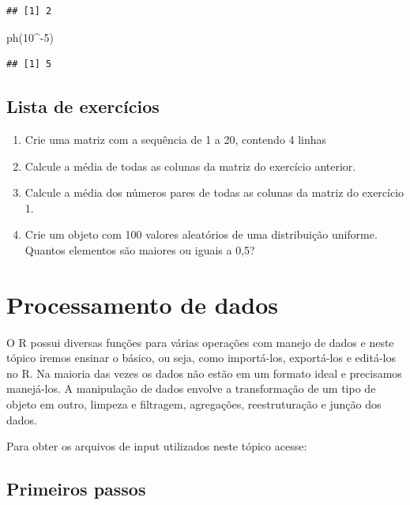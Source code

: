 \documentclass[
]{book}
\newenvironment{Shaded}{\begin{snugshade}}{\end{snugshade}}
\newcommand{\DecValTok}[1]{\textcolor[rgb]{0.00,0.00,0.81}{#1}}
\newcommand{\FunctionTok}[1]{\textcolor[rgb]{0.00,0.00,0.00}{#1}}
\newcommand{\NormalTok}[1]{#1}
\newcommand{\SpecialCharTok}[1]{\textcolor[rgb]{0.00,0.00,0.00}{#1}}
\providecommand{\tightlist}{%
  \setlength{\itemsep}{0pt}\setlength{\parskip}{0pt}}
\begin{document}
\begin{verbatim}
## [1] 2
\end{verbatim}

\begin{Shaded}
\begin{Highlighting}[]
\FunctionTok{ph}\NormalTok{(}\DecValTok{10}\SpecialCharTok{\^{}{-}}\DecValTok{5}\NormalTok{)}
\end{Highlighting}
\end{Shaded}

\begin{verbatim}
## [1] 5
\end{verbatim}

\hypertarget{lista-de-exercuxedcios-1}{%
\section{Lista de exercícios}\label{lista-de-exercuxedcios-1}}

\begin{enumerate}
\def\labelenumi{\arabic{enumi}.}
\tightlist
\item
  Crie uma matriz com a sequência de 1 a 20, contendo 4 linhas
\item
  Calcule a média de todas as colunas da matriz do exercício anterior.
\item
  Calcule a média dos números pares de todas as colunas da matriz do exercício 1.
\item
  Crie um objeto com 100 valores aleatórios de uma distribuição uniforme. Quantos elementos são maiores ou iguais a 0,5?
\end{enumerate}

\hypertarget{processamento-de-dados}{%
\chapter{Processamento de dados}\label{processamento-de-dados}}

O R possui diversas funções para várias operações com manejo de dados e neste tópico iremos ensinar o básico, ou seja, como importá-los, exportá-los e editá-los no R. Na maioria das vezes os dados não estão em um formato ideal e precisamos manejá-los. A manipulação de dados envolve a transformação de um tipo de objeto em outro, limpeza e filtragem, agregações, reestruturação e junção dos dados.

Para obter os arquivos de input utilizados neste tópico acesse:

\hypertarget{primeiros-passos}{%
\section{Primeiros passos}\label{primeiros-passos}}
\end{document}
